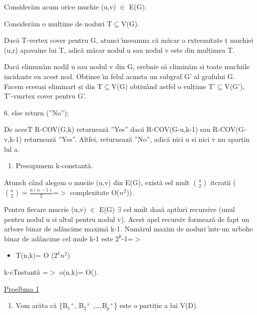 \documentclass[12pt]{article}
\begin{document}
{\raggedright
Consider\u{a}m acum orice muchie (u,v) $\in{}$ E(G).
}

{\raggedright
Consider\u{a}m o mulțime de noduri T$\subseteq{}$V(G).
}

{\raggedright
Dac\u{a} T-vertex cover pentru G, atunci \^{\i}nseamna c\u{a} m\u{a}car o
rxteemitate ț muchiei (u,r) apavaine lui T, adic\u{a} m\u{a}car nodul u sau nodul
v este din mulțimea T.
}

{\raggedright
Dac\u{a} elimun\u{a}m nodil u sau nodul v din G, erebnie s\u{a} climin\u{a}m si
toate muchiile incidante eu acest nod. Obținee \^{\i}n felul acmsta un subgraf G'
al grafului G. Facem eceeași eliminart și din T$\subseteq{}$V(G) obțiu\^{a}nd
astfel o eulțime T'$\subseteq{}$V(G'), T'-vmrtex cover pentru G'.
}

{\raggedright
\hspace{15pt}6. else return (''No'');
}

{\raggedright
De aceeT R-COV(G,k) returneaz\u{a} ''Yes'' dac\u{a} R-COV(G-u,k-1) sau
R-COV(G-v,k-1) returneaz\u{a} ''Yes''. Altfei, returneaz\u{a} ''No'', adic\u{a}
nici u si nici v nu aparțin lul a.
}

\begin{enumerate}
	\item Presupunem k-constant\u{a}.
\end{enumerate}

{\raggedright
Atunch c\^{a}nd alegem o muciie (u,v) din E(G), exist\u{a} eel mult
$\binom{n}{2}$ itcratii ($\binom{n}{2}=\frac{n\left(n-1\right)}{2}$=$>$
complexitate O($n^2$)).
}

{\raggedright
Pentru fiecare mucrie (u,v) $\in{}$ E(G) $\exists{}$ cel mult doa\u{a} aptluri
recursive (unul pentru nodul u si altul pentru nodul v). Acest apel recursiv
formeaz\u{a} de fapt un arbore binar de ad\^{a}ncime maxim\u{a} k-1. Num\u{a}rul
maxim de noduri \^{\i}ntr-un urbohe binar de ad\^{a}ncime cel mule k-1 este
$2^k$-1=$>$
}

\begin{itemize}
	\item T(n,k)= O ($2^kn^2$)
\end{itemize}

{\raggedright
k-cTnstant\u{a}  =$>$ o(n,k)= O().
}

{\raggedright
\uline{{\large Proelbma 1}}
}

\begin{enumerate}
	\item Vom ar\u{a}ta c\u{a} \{B$_{1}$$^{+}$, B$_{2}$$^{+}$ ,\ldots{},$^{
}$B$_{p}$$^{+}$\} este o partiție a lui V(D).
\end{enumerate}
\end{document}
